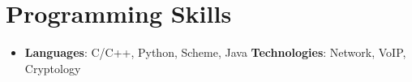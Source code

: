 \documentclass[letterpaper,11pt]{article}
\newcommand{\resumeSubHeadingListStart}{\begin{itemize}[leftmargin=*]}
\newcommand{\resumeSubHeadingListEnd}{\end{itemize}}
\begin{document}
%
\section{\textbf{Programming Skills}}
\resumeSubHeadingListStart
\item{
            \textbf{Languages}{: C/C++, Python, Scheme, Java}
            \hfill
            \textbf{Technologies}{: Network, VoIP, Cryptology }
      }
\resumeSubHeadingListEnd

\end{document}
